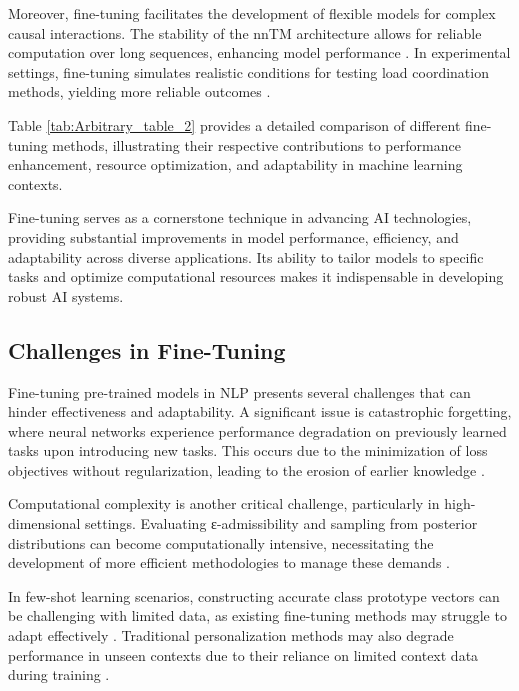 Moreover, fine-tuning facilitates the development of flexible models for complex causal interactions. The stability of the nnTM architecture allows for reliable computation over long sequences, enhancing model performance \cite{stogin2022provablystableneuralnetwork}. In experimental settings, fine-tuning simulates realistic conditions for testing load coordination methods, yielding more reliable outcomes \cite{geller2023tunableexperimentaltestbedevaluating}.

Table \ref{tab:Arbitrary_table_2} provides a detailed comparison of different fine-tuning methods, illustrating their respective contributions to performance enhancement, resource optimization, and adaptability in machine learning contexts.

Fine-tuning serves as a cornerstone technique in advancing AI technologies, providing substantial improvements in model performance, efficiency, and adaptability across diverse applications. Its ability to tailor models to specific tasks and optimize computational resources makes it indispensable in developing robust AI systems.


\subsection{Challenges in Fine-Tuning} \label{subsec:Challenges in Fine-Tuning}

Fine-tuning pre-trained models in NLP presents several challenges that can hinder effectiveness and adaptability. A significant issue is catastrophic forgetting, where neural networks experience performance degradation on previously learned tasks upon introducing new tasks. This occurs due to the minimization of loss objectives without regularization, leading to the erosion of earlier knowledge \cite{goldfarb2022analysiscatastrophicforgettingrandom}.

Computational complexity is another critical challenge, particularly in high-dimensional settings. Evaluating ε-admissibility and sampling from posterior distributions can become computationally intensive, necessitating the development of more efficient methodologies to manage these demands \cite{williams2018nonpenalizedvariableselectionhighdimensional}. 

In few-shot learning scenarios, constructing accurate class prototype vectors can be challenging with limited data, as existing fine-tuning methods may struggle to adapt effectively \cite{ge2024psppretrainingstructureprompt}. Traditional personalization methods may also degrade performance in unseen contexts due to their reliance on limited context data during training \cite{kaur2024cropcontextwiserobuststatic}.


